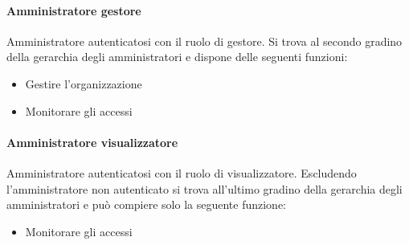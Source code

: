 \paragraph{Amministratore gestore}
Amministratore autenticatosi con il ruolo di gestore. 
Si trova al secondo gradino della gerarchia degli amministratori e dispone delle seguenti funzioni:
\begin{itemize}
\item Gestire l'organizzazione
\item Monitorare gli accessi
\end{itemize}
\paragraph{Amministratore visualizzatore}
Amministratore autenticatosi con il ruolo di visualizzatore.
Escludendo l'amministratore non autenticato si trova all'ultimo gradino della gerarchia degli amministratori e può compiere solo la seguente funzione:
\begin{itemize}
\item Monitorare gli accessi
\end{itemize}




